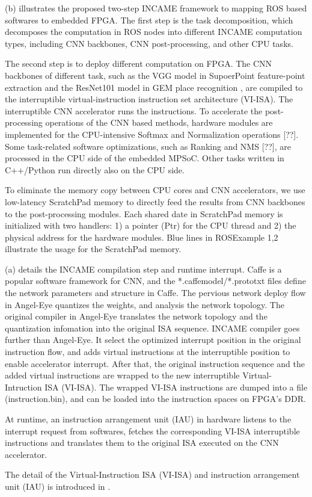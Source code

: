 (b) illustrates the proposed two-step INCAME framework to mapping ROS based softwares to embedded FPGA.
The first step is the task decomposition, which decomposes the computation in ROS nodes into different INCAME computation types, including CNN backbones, CNN post-processing, and other CPU tasks. 

The second step is to deploy different computation on FPGA. 
The CNN backbones of  different task, such as the VGG model \cite{kim2016accurate} in SupoerPoint feature-point extraction \cite{detone2018superpoint} and the ResNet101 model \cite{he2016deep} in GEM place recognition \cite{radenovic2018fine}, are compiled to the interruptible virtual-instruction instruction set architecture (VI-ISA). 
The interruptible CNN accelerator runs the instructions.
To accelerate the post-processing operations of the CNN based methods, hardware modules are implemented for the CPU-intensive Softmax and Normalization operations [??]. Some task-related software optimizations, such as Ranking and NMS [??], are processed in the CPU side of the embedded MPSoC\cite{MPSoC}.
Other tasks written in C++/Python run directly also on the CPU side.

To eliminate the memory copy between CPU cores and CNN accelerators, we use low-latency ScratchPad memory \cite{Banakar2002Scratchpad} to directly feed the results from CNN backbones to the post-processing modules. Each shared date in ScratchPad memory is initialized with two handlers: 1) a pointer (Ptr) for the CPU thread and 2) the physical address for the hardware modules. Blue lines in  ROSExample 1,2 illustrate the usage for the ScratchPad memory.

(a) details the INCAME compilation step and runtime interrupt. Caffe \cite{jia2014caffe} is a popular software framework for CNN, and the *.caffemodel/*.prototxt files define the network parameters and structure in Caffe. The pervious network deploy flow in Angel-Eye \cite{guo2017angel} quantizes the weights, and analysis the network topology. The original compiler in Angel-Eye translates the network topology and the quantization infomation into the original ISA sequence. INCAME compiler goes further than Angel-Eye. It select the optimized interrupt position in the original instruction flow, and adds virtual instructions at the interruptible position to enable accelerator interrupt. After that, the original instruction sequence and the added virtual instructions are wrapped to the new interruptible Virtual-Intruction ISA (VI-ISA). The wrapped VI-ISA instructions are dumped into a file (instruction.bin), and can be loaded into the instruction spaces on FPGA's DDR.

At runtime, an instruction arrangement unit (IAU) in hardware listens to the interrupt request from softwares, fetches the corresponding VI-ISA interruptible instructions and translates them to the original ISA executed on the CNN accelerator. 

The detail of the Virtual-Instruction ISA (VI-ISA) and instruction arrangement unit (IAU) is introduced in .